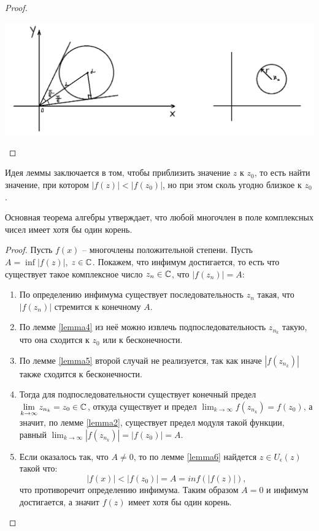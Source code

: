 \begin{proof}
    \begin{center}
        \includegraphics[width=1\textwidth]{images/lec2_1.png}
    \end{center}
\end{proof}

\begin{note}
    Идея леммы заключается в том, чтобы приблизить значение $z$ к $z_0$, то есть найти значение, 
    при котором $|f(z)| < |f(z_0)|$, но при этом сколь угодно близкое к $z_0$. 
\end{note}

\begin{reminder}
    Основная теорема алгебры утверждает, что любой многочлен в поле комплексных чисел имеет хотя бы один корень.
\end{reminder}

\begin{proof}
    Пусть $f(x)$ -- многочлены положительной степени. Пусть $A = \inf |f(z)|$, $z \in \mathbb{C}$. 
    Покажем, что инфимум достигается, то есть что существует такое комплексное число $z_n \in \mathbb{C}$, 
    что $|f(z_n)| = A$:
    \begin{enumerate}
        \item 
        По определению инфимума существует последовательность ${z_n}$ такая, что $|f(z_n)|$ стремится к конечному $A$. 
        \item 
        По лемме \ref{lemma4} из неё можно извлечь подпоследовательность ${z_{n_k}}$ такую, что она 
        сходится к $z_0$ или к бесконечности. 
        \item 
        По лемме \ref{lemma5} второй случай не реализуется, так как иначе $|f(z_{n_k})|$ также 
        сходится к бесконечности. 
        \item 
        Тогда для подпоследовательности существует конечный предел $\displaystyle\lim_{k\to \infty} 
        {z_{n_k}} = z_0 \in \mathbb{C}$, откуда существует и предел $\displaystyle\lim_{k\to \infty} 
        {f(z_{n_k})} = f(z_0)$, а значит, по лемме \ref{lemma2}, существует предел модуля такой функции, равный
        $\displaystyle\lim_{k\to \infty} {|f(z_{n_k})|} = |f(z_0)| = A$. 
        \item 
        Если оказалось так, что $A \neq 0$, то по лемме \ref{lemma6} найдется $z \in U_{\epsilon}(z)$ такой что:
        $$|f(x)| < |f(z_0)| = A = inf(|f(z)|),$$ что противоречит определению инфимума. Таким образом $A = 0$
        и инфимум достигается, а значит $f(z)$ имеет хотя бы один корень.
    \end{enumerate} 
\end{proof}


